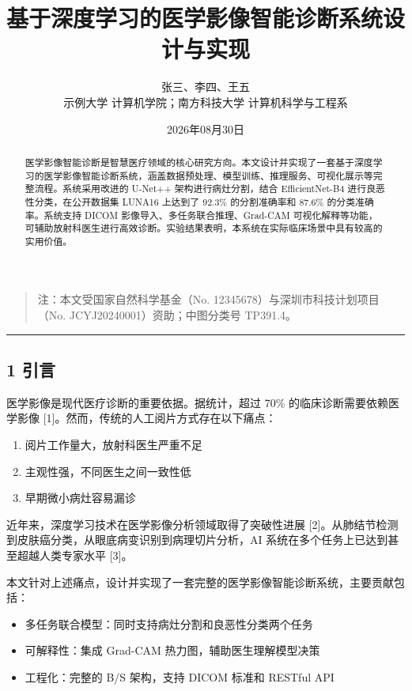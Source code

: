 \documentclass{harryopo-paper}
\title{基于深度学习的医学影像智能诊断系统设计与实现}
\author{张三、李四、王五\\ \fzfs\small 示例大学 计算机学院；南方科技大学 计算机科学与工程系}
\date{2026年08月30日}
\begin{document}
\maketitle
\begin{abstract}
医学影像智能诊断是智慧医疗领域的核心研究方向。本文设计并实现了一套基于深度学习的医学影像智能诊断系统，涵盖数据预处理、模型训练、推理服务、可视化展示等完整流程。系统采用改进的 U-Net++ 架构进行病灶分割，结合 EfficientNet-B4 进行良恶性分类，在公开数据集 LUNA16 上达到了 92.3\% 的分割准确率和 87.6\% 的分类准确率。系统支持 DICOM 影像导入、多任务联合推理、Grad-CAM 可视化解释等功能，可辅助放射科医生进行高效诊断。实验结果表明，本系统在实际临床场景中具有较高的实用价值。
\end{abstract}

\begin{quote}
注：本文受国家自然科学基金（No. 12345678）与深圳市科技计划项目（No. JCYJ20240001）资助；中图分类号 TP391.4。
\end{quote}

\medskip\hrule\medskip

\subsection*{1 引言}

医学影像是现代医疗诊断的重要依据。据统计，超过 70\% 的临床诊断需要依赖医学影像 [1]。然而，传统的人工阅片方式存在以下痛点：

\begin{enumerate}
  \item 阅片工作量大，放射科医生严重不足
  \item 主观性强，不同医生之间一致性低
  \item 早期微小病灶容易漏诊
\end{enumerate}

近年来，深度学习技术在医学影像分析领域取得了突破性进展 [2]。从肺结节检测到皮肤癌分类，从眼底病变识别到病理切片分析，AI 系统在多个任务上已达到甚至超越人类专家水平 [3]。

本文针对上述痛点，设计并实现了一套完整的医学影像智能诊断系统，主要贡献包括：

\begin{itemize}
  \item {\fzht 多任务联合模型}：同时支持病灶分割和良恶性分类两个任务
  \item {\fzht 可解释性}：集成 Grad-CAM 热力图，辅助医生理解模型决策
  \item {\fzht 工程化}：完整的 B/S 架构，支持 DICOM 标准和 RESTful API
\end{itemize}
\end{document}
